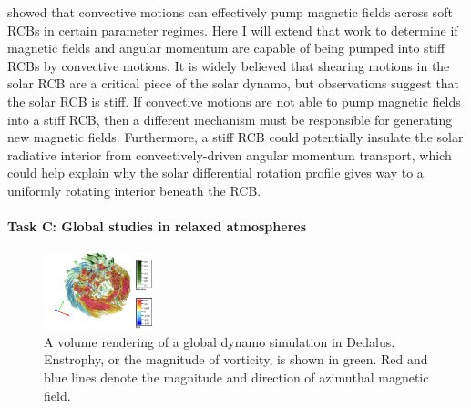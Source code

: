 \documentclass[11pt, preprint]{aastex}
\begin{document}
\citet{tobias&all1998} showed that convective motions can effectively pump magnetic fields across soft RCBs in certain parameter regimes.
Here I will extend that work  to determine if magnetic fields and angular momentum are capable of being pumped into stiff RCBs by convective motions.
It is widely believed that shearing motions in the solar RCB are a critical piece of the solar dynamo, but observations \citep{basu1997} suggest that the solar RCB is stiff.
If convective motions are not able to pump magnetic fields into a stiff RCB, then a different mechanism must be responsible for generating new magnetic fields.
Furthermore, a stiff RCB could potentially insulate the solar radiative interior from convectively-driven angular momentum transport, which could help explain why the solar differential rotation profile gives way to a uniformly rotating interior beneath the RCB.

\vspace{-0.5cm}
\paragraph{Task C: Global studies in relaxed atmospheres}
\label{sct:taskC}

\begin{figure}
	\begin{center}
	\vspace{-10pt}
    \includegraphics[width=0.28\textwidth]{./figs/mdwarf.png}
	\vspace{-15pt}
	\end{center}
    \caption{A volume rendering of a global dynamo simulation in Dedalus.
	Enstrophy, or the magnitude of vorticity, is shown in green.
	Red and blue lines denote the magnitude and direction of azimuthal magnetic field.
	\label{fig:mdwarf} }
\end{figure}
\end{document}
